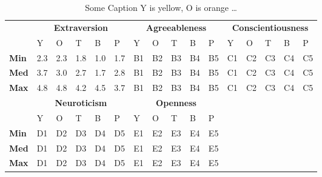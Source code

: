 \begin{table}
\renewcommand{\arraystretch}{1.2}
\begin{center}
\begin{tabular}{p{}|
			p{0.025\textwidth}|p{}|p{}|p{}|p{}||
			p{}|p{}|p{}|p{}|p{}||
			p{}|p{}|p{}|p{}|p{}|}
\cline{2-16}
  & \multicolumn{5}{c||}{\textbf{Extraversion}} & \multicolumn{5}{c||}{\textbf{Agreeableness}} & \multicolumn{5}{c|}{\textbf{Conscientiousness}} \\
\cline{2-16}
 			& Y & O & T & B & P 			& Y & O & T & B & P  	 	& Y & O & T & B & P     \\
\cline{2-16}
\textbf{Min}  	& 2.3 & 2.3 & 1.8 & 1.0 & 1.7 		& B1 & B2 & B3 & B4 & B5  	& C1 & C2 & C3 & C4 & C5  \\

\textbf{Med} 	& 3.7 & 3.0 & 2.7 & 1.7 & 2.8 		& B1 & B2 & B3 & B4 & B5  	& C1 & C2 & C3 & C4 & C5  \\

\textbf{Max}	& 4.8 & 4.8 & 4.2 & 4.5 & 3.7 		& B1 & B2 & B3 & B4 & B5  	& C1 & C2 & C3 & C4 & C5 \\
\cline{2-16}

\cline{2-11}
&  \multicolumn{5}{|c||}{\textbf{Neuroticism}} & \multicolumn{5}{|c||}{\textbf{Openness}} \\
\cline{2-11}
				& Y & O & T & B & P 			& Y & O & T & B & P    		\\
\cline{2-11}
	\textbf{Min} 	& D1 & D2 & D3 & D4 & D5 		& E1 & E2 & E3 & E4 & E5 	\\

	\textbf{Med}  & D1 & D2 & D3 & D4 & D5 		& E1 & E2 & E3 & E4 & E5 	\\

	\textbf{Max}  	& D1 & D2 & D3 & D4 & D5 		& E1 & E2 & E3 & E4 & E5  	\\
\cline{2-11}

\end{tabular}
\end{center}
\caption{Some Caption Y is yellow, O is orange \ldots}
\label{table:e-c}
\end{table}


